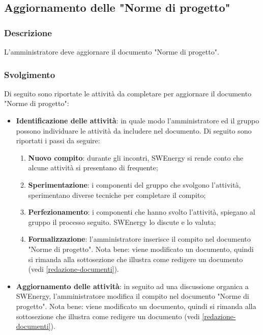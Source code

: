 \subsection{Aggiornamento delle "Norme di progetto"}
\label{aggiornare-ndp}

\subsubsection{Descrizione}

L'amministratore deve aggiornare il documento "Norme di progetto".

\subsubsection{Svolgimento}
Di seguito sono riportate le attività da completare per aggiornare il documento
"Norme di progetto":
\begin{itemize}
	\item \textbf{Identificazione delle attività}: in quale modo
	      l'amministratore ed il gruppo possono individuare le attività da
	      includere nel documento. Di seguito sono riportati i passi da
	      seguire:
	      \begin{enumerate}
		      \item \textbf{Nuovo compito}: durante gli incontri,
		            SWEnergy si rende conto che alcune attività si
		            presentano di frequente;

		      \item \textbf{Sperimentazione}: i componenti del gruppo che
		            svolgono l'attività, sperimentano diverse tecniche per
		            completare il compito;

		      \item \textbf{Perfezionamento}: i componenti che hanno
		            svolto l'attività, spiegano al gruppo il processo
		            seguito. SWEnergy lo discute e lo valuta;

		      \item \textbf{Formalizzazione}: l'amministratore inserisce il
		            compito nel documento "Norme di progetto". Nota bene:
		            viene modificato un documento, quindi si rimanda alla
		            sottosezione che illustra come redigere un documento
		            (vedi \autoref{redazione-documenti}).
	      \end{enumerate}

	\item \textbf{Aggiornamento delle attività}: in seguito ad una discussione
	      organica a SWEnergy, l'amministratore modifica il
	      compito nel documento "Norme di progetto". Nota bene:
	      viene modificato un documento, quindi si rimanda alla
	      sottosezione che illustra come redigere un documento
	      (vedi \autoref{redazione-documenti}).
\end{itemize}
